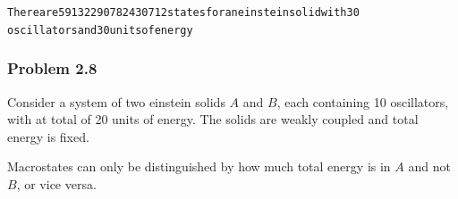 \documentclass[letterpaper,10pt,english]{/usr/local/lib/python2.7/dist-packages/sphinx/texinputs/sphinxhowto}
\newenvironment{InvisibleVerbatim}
        {\begin{mdframed}[leftmargin=0.1\linewidth,innerleftmargin=3pt,innerrightmargin=3pt, userdefinedwidth=1\linewidth, linewidth=0pt, linecolor=white, usetwoside=false]}
        {\end{mdframed}}
\begin{document}
        

            
                \begin{InvisibleVerbatim}
                \vspace{-0.5\baselineskip}
\begin{alltt}There are 59132290782430712 states for an einstein solid with 30
oscillators and 30 units of energy
\end{alltt}

            \end{InvisibleVerbatim}
            
        
    
\subsubsection{Problem 2.8}Consider a system of two einstein solids \(A\) and \(B\), each
containing 10 oscillators, with at total of 20 units of energy. The
solids are weakly coupled and total energy is fixed.

Macrostates can only be distinguished by how much total energy is in
\(A\) and not \(B\), or vice versa.

\end{document}

